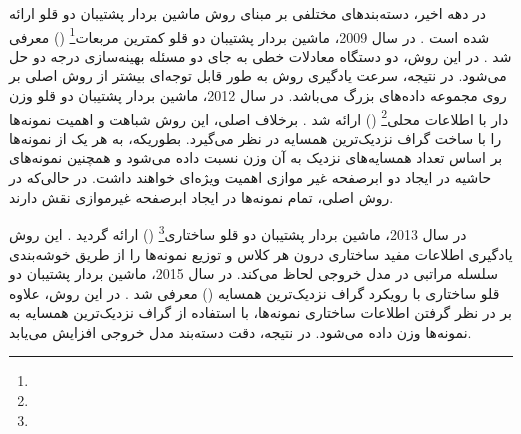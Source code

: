 در دهه اخیر، دسته‌بندهای مختلفی بر مبنای روش ماشین بردار پشتیبان دو قلو ارائه شده است \cite{ding2017,huang2018}. در سال 2009، ماشین بردار پشتیبان دو قلو کمترین مربعات\footnote{}  () معرفی شد \cite{kumar2009}. در این روش، دو دستگاه معادلات خطی به جای دو مسئله بهینه‌سازی درجه دو حل می‌شود. در نتیجه، سرعت یادگیری روش  به طور قابل توجه‌ای بیشتر از روش  اصلی بر روی مجموعه داده‌های بزرگ می‌باشد. در سال 2012، ماشین بردار پشتیبان دو قلو وزن دار با اطلاعات محلی\footnote{}  () ارائه شد \cite{ye2012}. برخلاف  اصلی، این روش شباهت و اهمیت نمونه‌ها را با ساخت گراف نزدیک‌ترین همسایه در نظر می‌گیرد. بطوریکه، به هر یک از نمونه‌ها بر اساس تعداد همسایه‌های نزدیک به آن وزن نسبت داده می‌شود و همچنین نمونه‌های حاشیه در ایجاد دو ابرصفحه غیر موازی اهمیت ویژه‌ای خواهند داشت. در حالی‌که در روش  اصلی، تمام نمونه‌ها در ایجاد ابرصفحه غیرموازی نقش دارند.

در سال 2013، ماشین بردار پشتیبان دو قلو ساختاری\footnote{}  () ارائه گردید \cite{qi2013}.  این روش یادگیری اطلاعات مفید ساختاری درون هر کلاس و توزیع نمونه‌ها را از طریق خوشه‌بندی سلسله مراتبی در مدل خروجی لحاظ می‌کند.  در سال 2015، ماشین بردار پشتیبان دو قلو ساختاری با رویکرد گراف نزدیک‌ترین همسایه () معرفی شد \cite{pan2015}. در این روش، علاوه بر در نظر گرفتن اطلاعات ساختاری نمونه‌ها، با استفاده از گراف نزدیک‌ترین همسایه به نمونه‌ها وزن داده می‌شود. در نتیجه، دقت دسته‌بند مدل خروجی افزایش می‌یابد.

